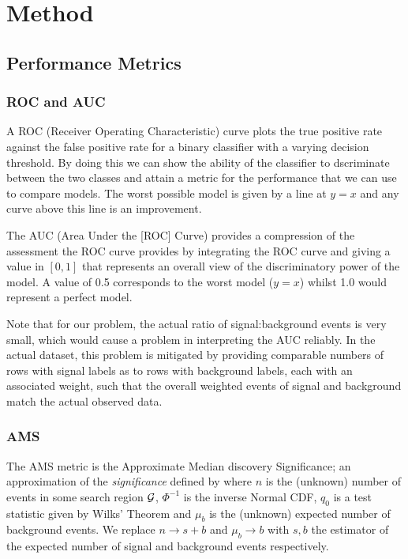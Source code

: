 \section{Method}
\label{method}

\subsection{Performance Metrics}

\subsubsection{ROC and AUC}
A ROC (Receiver Operating Characteristic) curve plots the true positive rate against the false positive rate for a binary classifier with a varying decision threshold. By doing this we can show the ability of the classifier to dscriminate between the two classes and attain a metric for the performance that we can use to compare models. The worst possible model is given by a line at $y=x$ and any curve above this line is an improvement. 

The AUC (Area Under the [ROC] Curve) provides a compression of the assessment the ROC curve provides by integrating the ROC curve and giving a value in $[0,1]$ that represents an overall view of the discriminatory power of the model. A value of 0.5 corresponds to the worst model ($y=x$) whilst 1.0 would represent a perfect model. 

Note that for our problem, the actual ratio of signal:background events is very small, which would cause a problem in interpreting the AUC reliably. In the actual dataset, this problem is mitigated by providing comparable numbers of rows with signal labels as to rows with background labels, each with an associated weight, such that the overall weighted events of signal and background match the actual observed data.

\subsubsection{AMS}
The AMS metric is the Approximate Median discovery Significance;  an approximation of the \emph{significance} defined by 
where $n$ is the (unknown) number of events in some search region $\mathcal{G}$, $\Phi^{-1}$ is the inverse Normal CDF, $q_0$ is a test statistic given by Wilks' Theorem and $\mu_b$ is the (unknown) expected number of background events. We replace $n\rightarrow s+b$ and $\mu_b\rightarrow b$ with $s,b$ the estimator of the expected number of signal and background events respectively.

